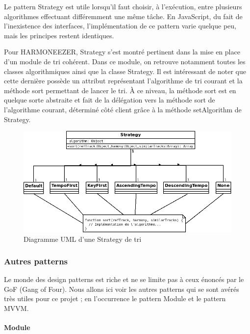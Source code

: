 \documentclass[a4paper,12pt]{article}
\begin{document}
Le pattern Strategy est utile lorsqu'il faut choisir, à l'exécution, entre plusieurs algorithmes effectuant différemment une même tâche. En JavaScript, du fait de l'inexistence des interfaces, l'implémentation de ce pattern varie quelque peu, mais les principes restent identiques.

Pour HARMONEEZER, Strategy s'est montré pertinent dans la mise en place d'un module de tri cohérent. Dans ce module, on retrouve notamment toutes les classes algorithmiques ainsi que la classe Strategy. Il est intéressant de noter que cette dernière possède un attribut représentant l'algorithme de tri courant et la méthode sort permettant de lancer le tri. À ce niveau, la méthode sort est en quelque sorte abstraite et fait de la délégation vers la méthode sort de l'algorithme courant, déterminé côté client grâce à la méthode setAlgorithm de Strategy.

\begin{figure}[!h]
  \begin{center}
    \includegraphics[scale=0.5]{Strategy.png}
    \caption{Diagramme UML d'une Strategy de tri}
  \end{center}
\end{figure}

\subsubsection{Autres patterns}

Le monde des design patterns est riche et ne se limite pas à ceux énoncés par le GoF (Gang of Four). Nous allons ici voir les autres patterns qui se sont avérés très utiles pour ce projet ; en l'occurrence le pattern Module et le pattern MVVM.

\paragraph{Module}
\end{document}
